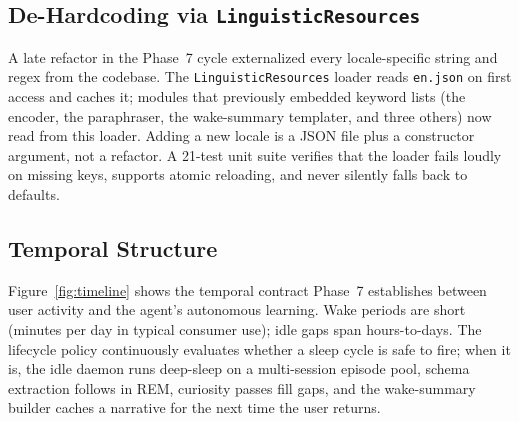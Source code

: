 \documentclass[11pt,twocolumn]{article}
\begin{document}
\subsection{De-Hardcoding via \texttt{LinguisticResources}}

A late refactor in the Phase~7 cycle externalized every locale-specific string and regex from the codebase. The \texttt{LinguisticResources} loader reads \texttt{en.json} on first access and caches it; modules that previously embedded keyword lists (the encoder, the paraphraser, the wake-summary templater, and three others) now read from this loader. Adding a new locale is a JSON file plus a constructor argument, not a refactor. A 21-test unit suite verifies that the loader fails loudly on missing keys, supports atomic reloading, and never silently falls back to defaults.

\subsection{Temporal Structure}

Figure~\ref{fig:timeline} shows the temporal contract Phase~7 establishes between user activity and the agent's autonomous learning. Wake periods are short (minutes per day in typical consumer use); idle gaps span hours-to-days. The lifecycle policy continuously evaluates whether a sleep cycle is safe to fire; when it is, the idle daemon runs deep-sleep on a multi-session episode pool, schema extraction follows in REM, curiosity passes fill gaps, and the wake-summary builder caches a narrative for the next time the user returns.
\end{document}
